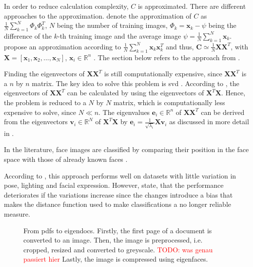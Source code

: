 
In order to reduce calculation complexity, $C$ is approximated.
There are different approaches to the approximation.
\citeauthor{eigenfaces1991} \cite{eigenfaces1991} denote the approximation of $C$ as 
$\frac{1}{N}\sum_{k=1}^{N}\Phi_{k}\Phi_{k}^{T}$, $N$ being the number of training images, $\Phi_{k} = \mathbf{x}_{k} - {\psi }$ 
being the difference of the $k$-th training image and the average image $\psi = \frac{1}{N}\sum_{k=1}^{N}\textbf{x}_{k}$.
\citeauthor{eigenfaces1997} propose an approximation according to $\frac{1}{N}\sum_{k=1}^{N}\textbf{x}_{k}\textbf{x}_{k}^{T}$ and thus, $\textbf{C} \simeq \frac{1}{N}\textbf{X}\textbf{X}^{T}$, 
with $\textbf{X} = \left[ \textbf{x}_{1}, \textbf{x}_{2}, ..., \textbf{x}_{N} \right]$, $\textbf{x}_i \in \mathbb{R}^{n}$ \cite{eigenfaces1997}.
The section below refers to the approach from \citeauthor{eigenfaces1997}.

Finding the eigenvectors of $\textbf{X}\textbf{X}^{T}$ is still computationally expensive, since $\textbf{X}\textbf{X}^{T}$ is a $n$ by $n$ matrix.
The key idea to solve this problem is \ac{svd} \cite{eigenfaces1997}.
According to \citeauthor{eigenfaces1997}, the eigenvectors of $\textbf{X}\textbf{X}^{T}$ can be calculated by using the eigenvectors of $\textbf{X}^{T}\textbf{X}$.
Hence, the problem is reduced to a $N$ by $N$ matrix, which is computationally less expensive to solve, since $N \ll n$.
The eigenvalues $\textbf{e}_i \in \mathbb{R}^{n}$ of $\textbf{X}\textbf{X}^{T}$ can be derived from the eigenvectors $\textbf{v}_i \in \mathbb{R}^{N}$ of $\textbf{X}^{T}\textbf{X}$ by 
$\textbf{e}_i = \frac{1}{\sqrt{\lambda_i}}\textbf{X}\textbf{v}_i$ as discussed in more detail in \cite{eigenfaces1997}.

In the literature, face images are classified by comparing their position in the face space with those of already known faces \cite{eigenfaces1991}.


According to \cite{eigenfaces1991}, this approach performs well on datasets with little variation in pose, lighting and facial expression.
However,  state, that the performance deteriorates if the variations increase since the changes introduce a bias 
that makes the distance function used to make classifications a no longer reliable measure.

\begin{figure}[htp] %
    \centering
    
    \caption{From \acp{pdf} to eigendocs.
    Firstly, the first page of a document is converted to an image.
    Then, the image is preprocessed, i.e. cropped, resized and converted to greyscale. \textcolor{red}{TODO: was genau passiert hier}
    Lastly, the image is compressed using eigenfaces.
    }
    \label{fig:eigendocs_procedure}
\end{figure}


